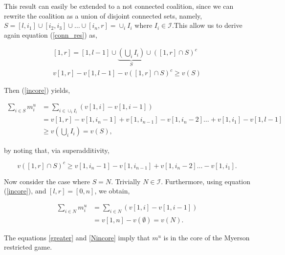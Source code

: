 \documentclass[american]{scrartcl}
\begin{document}
This result can easily be extended to a not connected coalition, since we can rewrite the coalition as a union of disjoint connected sets, namely, $S = [l, i_1] \cup [i_2, i_3] \cup \dots \cup [i_n, r] = \cup_i I_i$ where $I_i \in \mathcal{I}$.This allow us to derive again equation (\ref{conn_res}) as,

\begin{equation}
    \begin{split}
        [1, r] = [1, l - 1] \cup \underbrace{\left(\bigcup_i I_i\right)}_{S} \cup \left([1, r] \cap S\right)^c \\
        v[1, r] - v[1, l - 1] - v\left([1, r] \cap S\right)^c \geq v(S)
    \end{split}
\end{equation}

Then (\ref{incore}) yields,

\begin{equation} \label{greater}
    \begin{split}
        \sum_{i \in S} m^u_i &= \sum_{i \in \cup_i I_i} \left(v[1, i] - v[1, i-1]\right) \\
        &= v[1, r] - v[1, i_n - 1] + v[1, i_{n-1}] - v[1, i_n - 2] \ldots + v[1, i_1] - v[1, l-1] \\
        &\geq v\left(\bigcup_i I_i\right) = v(S),
    \end{split}
\end{equation}

by noting that, via superadditivity,

\begin{equation}
    v\left([1, r] \cap S\right)^c \geq v[1, i_n - 1] - v[1, i_{n-1}] + v[1, i_n - 2] \ldots - v[1, i_1].
\end{equation}

Now consider the case where $S = N$. Trivially $N \in \mathcal{I}$. Furthermore, using equation (\ref{incore}), and $[l, r] = [0, n]$, we obtain,

\begin{equation} \label{Nincore}
    \begin{split}
        \sum_{i \in N} m^u_i &= \sum_{i \in N} \left(v[1, i] - v[1, i-1]\right) \\
        &= v[1, n] - v(\emptyset) = v(N).
    \end{split}
\end{equation}

The equations \ref{greater} and \ref{Nincore} imply that $m^u$ is in the core of the Myerson restricted game.
\end{document}
